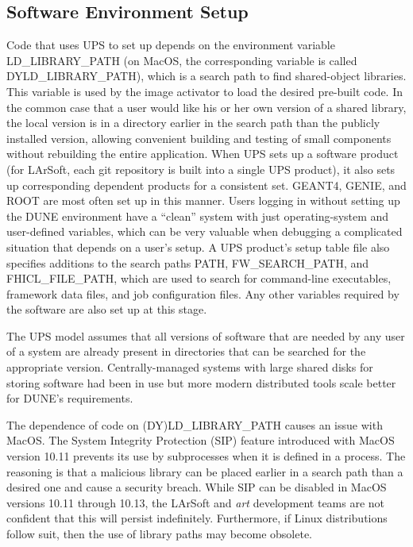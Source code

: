 \subsection{Software Environment Setup}

Code that uses UPS to set up depends on the environment variable LD\_LIBRARY\_PATH (on MacOS, the corresponding
variable is called DYLD\_LIBRARY\_PATH), which is a search path to find shared-object libraries.  This
variable is used by the image activator to load the desired pre-built code.  In the common case that a user
would like his or her own version of a shared library, the local version is in a directory earlier in the
search path than the publicly installed version, allowing convenient building and testing of small components
without rebuilding the entire application.  When UPS sets up a software product (for LArSoft, each git repository
is built into a single UPS product), it also sets up corresponding dependent products for a consistent set.
GEANT4, GENIE, and ROOT are most often set up in this manner.  Users logging in without setting up the DUNE
environment have a ``clean'' system with just operating-system and user-defined variables, which can be very
valuable when debugging a complicated situation that depends on a user's setup.
A UPS product's setup table file also specifies additions to the search paths PATH, FW\_SEARCH\_PATH, and FHICL\_FILE\_PATH,
which are used to search for command-line executables, framework data files, and job configuration files.  Any
other variables required by the software are also set up at this stage.

The UPS model assumes that all versions of software that are needed by any user of a system are already present
in directories that can be searched for the appropriate version.  Centrally-managed systems with large
shared disks for storing software had been in use but more modern distributed tools scale better for DUNE's
requirements.

The dependence of code on (DY)LD\_LIBRARY\_PATH causes an issue with MacOS.  The System Integrity Protection (SIP)
feature introduced with MacOS version 10.11 prevents its use by subprocesses when it is defined in a process.
The reasoning is that a malicious library can be placed earlier in a search path than a desired one and
cause a security breach.  While SIP can be disabled in MacOS versions 10.11 through 10.13, the LArSoft and
{\it art} development teams are not confident that this will persist indefinitely.  Furthermore, if Linux
distributions follow suit, then the use of library paths may become obsolete.

